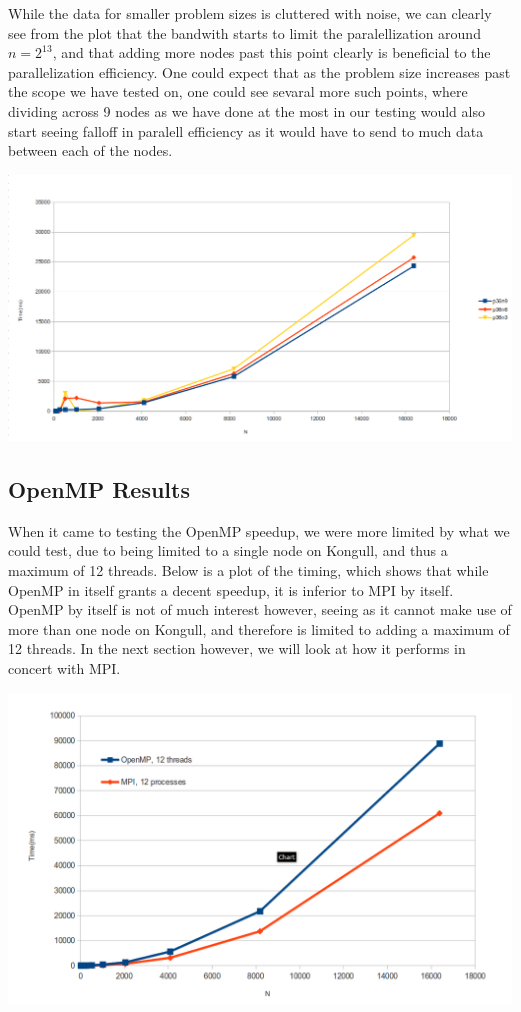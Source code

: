 \documentclass[fontsize=11pt,paper=a4,titlepage]{article}
\begin{document}
While the data for smaller problem sizes is cluttered with noise, we can clearly see from the plot that the bandwith starts to limit the paralellization around $n = 2^{13}$, and that adding more nodes past this point clearly is beneficial to the parallelization efficiency. One could expect that as the problem size increases past the scope we have tested on, one could see sevaral more such points, where dividing across 9 nodes as we have done at the most in our testing would also start seeing falloff in paralell efficiency as it would have to send to much data between each of the nodes.

\hspace*{-3.3cm}\includegraphics[scale=0.6]{pics/p36nX.png}

\newpage
\subsection{OpenMP Results}
When it came to testing the OpenMP speedup, we were more limited by what we could test, due to being limited to a single node on Kongull, and thus a maximum of 12 threads. Below is a plot of the timing, which shows that while OpenMP in itself grants a decent speedup, it is inferior to MPI by itself. OpenMP by itself is not of much interest however, seeing as it cannot make use of more than one node on Kongull, and therefore is limited to adding a maximum of 12 threads. In the next section however, we will look at how it performs in concert with MPI.

\hspace*{-3.3cm}\includegraphics[scale=0.6]{pics/omp.png}
\newpage
\end{document}
